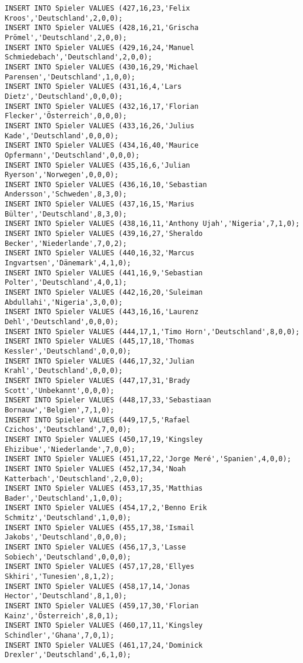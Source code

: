 \documentclass{lehramt-informatik-aufgabe}
\begin{document}
\begin{verbatim}
INSERT INTO Spieler VALUES (427,16,23,'Felix Kroos','Deutschland',2,0,0);
INSERT INTO Spieler VALUES (428,16,21,'Grischa Prömel','Deutschland',2,0,0);
INSERT INTO Spieler VALUES (429,16,24,'Manuel Schmiedebach','Deutschland',2,0,0);
INSERT INTO Spieler VALUES (430,16,29,'Michael Parensen','Deutschland',1,0,0);
INSERT INTO Spieler VALUES (431,16,4,'Lars Dietz','Deutschland',0,0,0);
INSERT INTO Spieler VALUES (432,16,17,'Florian Flecker','Österreich',0,0,0);
INSERT INTO Spieler VALUES (433,16,26,'Julius Kade','Deutschland',0,0,0);
INSERT INTO Spieler VALUES (434,16,40,'Maurice Opfermann','Deutschland',0,0,0);
INSERT INTO Spieler VALUES (435,16,6,'Julian Ryerson','Norwegen',0,0,0);
INSERT INTO Spieler VALUES (436,16,10,'Sebastian Andersson','Schweden',8,3,0);
INSERT INTO Spieler VALUES (437,16,15,'Marius Bülter','Deutschland',8,3,0);
INSERT INTO Spieler VALUES (438,16,11,'Anthony Ujah','Nigeria',7,1,0);
INSERT INTO Spieler VALUES (439,16,27,'Sheraldo Becker','Niederlande',7,0,2);
INSERT INTO Spieler VALUES (440,16,32,'Marcus Ingvartsen','Dänemark',4,1,0);
INSERT INTO Spieler VALUES (441,16,9,'Sebastian Polter','Deutschland',4,0,1);
INSERT INTO Spieler VALUES (442,16,20,'Suleiman Abdullahi','Nigeria',3,0,0);
INSERT INTO Spieler VALUES (443,16,16,'Laurenz Dehl','Deutschland',0,0,0);
INSERT INTO Spieler VALUES (444,17,1,'Timo Horn','Deutschland',8,0,0);
INSERT INTO Spieler VALUES (445,17,18,'Thomas Kessler','Deutschland',0,0,0);
INSERT INTO Spieler VALUES (446,17,32,'Julian Krahl','Deutschland',0,0,0);
INSERT INTO Spieler VALUES (447,17,31,'Brady Scott','Unbekannt',0,0,0);
INSERT INTO Spieler VALUES (448,17,33,'Sebastiaan Bornauw','Belgien',7,1,0);
INSERT INTO Spieler VALUES (449,17,5,'Rafael Czichos','Deutschland',7,0,0);
INSERT INTO Spieler VALUES (450,17,19,'Kingsley Ehizibue','Niederlande',7,0,0);
INSERT INTO Spieler VALUES (451,17,22,'Jorge Meré','Spanien',4,0,0);
INSERT INTO Spieler VALUES (452,17,34,'Noah Katterbach','Deutschland',2,0,0);
INSERT INTO Spieler VALUES (453,17,35,'Matthias Bader','Deutschland',1,0,0);
INSERT INTO Spieler VALUES (454,17,2,'Benno Erik Schmitz','Deutschland',1,0,0);
INSERT INTO Spieler VALUES (455,17,38,'Ismail Jakobs','Deutschland',0,0,0);
INSERT INTO Spieler VALUES (456,17,3,'Lasse Sobiech','Deutschland',0,0,0);
INSERT INTO Spieler VALUES (457,17,28,'Ellyes Skhiri','Tunesien',8,1,2);
INSERT INTO Spieler VALUES (458,17,14,'Jonas Hector','Deutschland',8,1,0);
INSERT INTO Spieler VALUES (459,17,30,'Florian Kainz','Österreich',8,0,1);
INSERT INTO Spieler VALUES (460,17,11,'Kingsley Schindler','Ghana',7,0,1);
INSERT INTO Spieler VALUES (461,17,24,'Dominick Drexler','Deutschland',6,1,0);

\end{verbatim}
\end{document}
